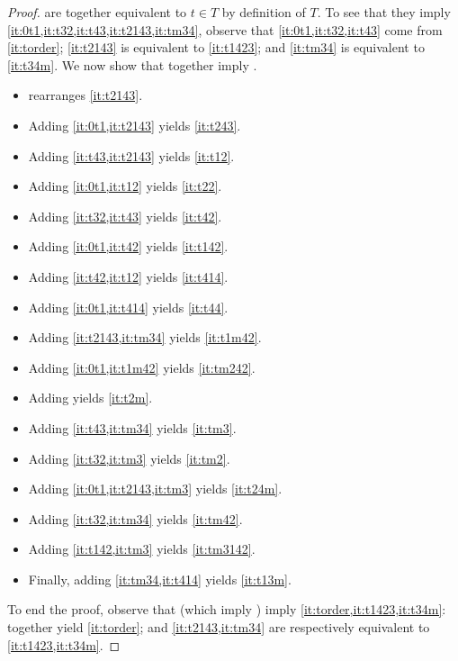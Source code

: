 \documentclass[pagesize, twoside=off, bibliography=totoc, DIV=calc, fontsize=12pt, a4paper]{scrartcl}
\begin{document}
\begin{proof}
	 are together equivalent to $t \in T$ by definition of $T$. 
	To see that they imply \cref{it:0t1,it:t32,it:t43,it:t2143,it:tm34}, observe that \cref{it:0t1,it:t32,it:t43} come from \cref{it:torder}; \cref{it:t2143} is equivalent to \cref{it:t1423}; and \cref{it:tm34} is equivalent to \cref{it:t34m}.
	We now show that  together imply .
	\begin{itemize}
		\item {} rearranges \cref{it:t2143}.
		\item Adding \cref{it:0t1,it:t2143} yields \cref{it:t243}.
		\item Adding \cref{it:t43,it:t2143} yields \cref{it:t12}.
		\item Adding \cref{it:0t1,it:t12} yields \cref{it:t22}.
		\item Adding \cref{it:t32,it:t43} yields \cref{it:t42}.
		\item Adding \cref{it:0t1,it:t42} yields \cref{it:t142}.
		\item Adding \cref{it:t42,it:t12} yields \cref{it:t414}.
		\item Adding \cref{it:0t1,it:t414} yields \cref{it:t44}.
		\item Adding \cref{it:t2143,it:tm34} yields \cref{it:t1m42}.
		\item Adding \cref{it:0t1,it:t1m42} yields \cref{it:tm242}.
		\item Adding  yields \cref{it:t2m}.
		\item Adding \cref{it:t43,it:tm34} yields \cref{it:tm3}.
		\item Adding \cref{it:t32,it:tm3} yields \cref{it:tm2}.
		\item Adding \cref{it:0t1,it:t2143,it:tm3} yields \cref{it:t24m}.
		\item Adding \cref{it:t32,it:tm34} yields \cref{it:tm42}.
		\item Adding \cref{it:t142,it:tm3} yields \cref{it:tm3142}.
		\item Finally, adding \cref{it:tm34,it:t414} yields \cref{it:t13m}.
	\end{itemize}
	To end the proof, observe that  (which imply ) imply \cref{it:torder,it:t1423,it:t34m}:  together yield \cref{it:torder}; and \cref{it:t2143,it:tm34} are respectively equivalent to \cref{it:t1423,it:t34m}.
\end{proof}
\end{document}
